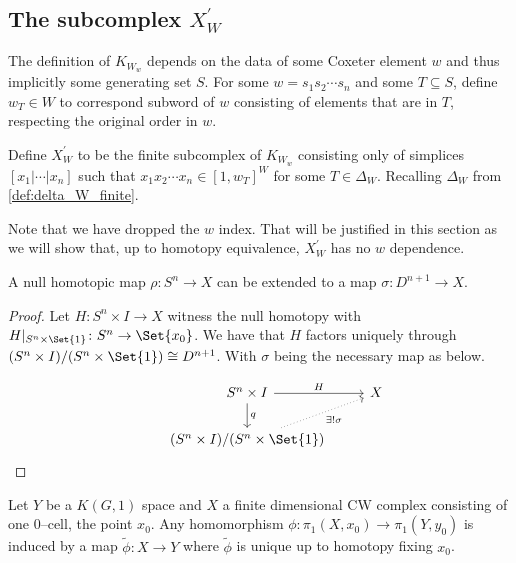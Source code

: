 \documentclass[class=article, crop=false]{standalone}
\begin{document}
\subsection{The subcomplex $X_{W}^\prime$}
The definition of $K_{W_w}$ depends on the data of some Coxeter element $w$ and thus implicitly some generating set $S$. For some $w = s_1s_2\cdots s_n$ and some $T\subseteq S$, define $w_T\in W$ to correspond subword of $w$ consisting of elements that are in $T$, respecting the original order in $w$. 
\begin{definition}
    Define $X_{W}^\prime$ to be the finite subcomplex of $K_{W_w}$ consisting only of simplices $[x_1 | \cdots | x_n]$ such that $x_1x_2\cdots x_n \in [1,w_T]^W$ for some $T \in \Delta_W$. Recalling $\Delta_W$ from \cref{def:delta_W_finite}. 
\end{definition}
Note that we have dropped the $w$ index. That will be justified in this section as we will show that, up to homotopy equivalence, $X_W^\prime$ has no $w$ dependence.

\begin{lemma}
    A null homotopic map $\rho \colon S^n \to X$ can be extended to a map $\sigma \colon D^{n+1} \to X$.
    \label{lem:null_homotopic_extension}
\end{lemma}
\begin{proof}
    Let $H \colon S^n \times I \to X$ witness the null homotopy with $H|_{S^n \times \Set{1}} \colon S^n \to \Set{x_0}$. We have that $H$ factors uniquely through $(S^n \times I)/(S^n \times \Set{1}) \cong D^{n+1}$. With $\sigma$ being the necessary map as below.

    \begin{equation*}
        \begin{tikzcd}
            &S^n \times I       \arrow[d, "q"]      \arrow[r, "H"]                                &X \\
            &(S^n \times I)/(S^n \times \Set{1})    \arrow[ru, "\exists ! \sigma", swap, dotted]
        \end{tikzcd}
    \end{equation*}

\end{proof}

\begin{theorem}
    Let $Y$ be a $K(G,1)$ space and $X$ a finite dimensional CW complex consisting of one 0--cell, the point $x_0$. Any homomorphism $\phi \colon \pi_1(X,x_0) \to \pi_1(Y,y_0)$ is induced by a map $\tilde{\phi} \colon X \to Y$ where $\tilde{\phi}$ is unique up to homotopy fixing $x_0$.
\end{theorem}
\end{document}
